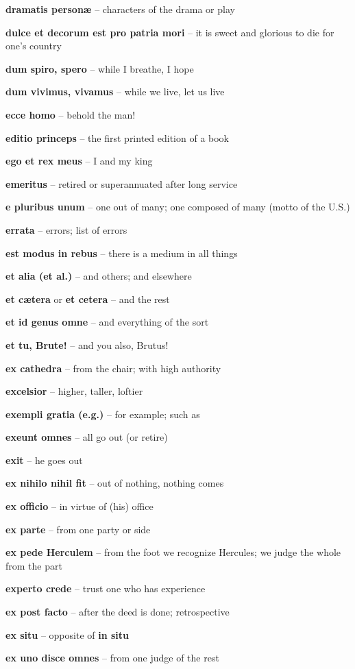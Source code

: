 \documentclass[12pt]{article}
\newcommand{\lat}[1]{\textbf{#1}}
\begin{document}
\lat{dramatis person\ae} -- characters of the drama or play

\lat{dulce et decorum est pro patria mori} -- it is sweet and glorious to die for one's country

\lat{dum spiro, spero} -- while I breathe, I hope

\lat{dum vivimus, vivamus} -- while we live, let us live

\lat{ecce homo} -- behold the man!

\lat{editio princeps} -- the first printed edition of a book

\lat{ego et rex meus} -- I and my king

\lat{emeritus} -- retired or superannuated after long service

\lat{e pluribus unum} -- one out of many; one composed of many (motto of the U.S.)

\lat{errata} -- errors; list of errors

\lat{est modus in rebus} -- there is a medium in all things

\lat{et alia (et al.)} -- and others; and elsewhere

\lat{et c\ae{tera}} or \lat{et cetera} -- and the rest

\lat{et id genus omne} -- and everything of the sort

\lat{et tu, Brute!} -- and you also, Brutus!

\lat{ex cathedra} -- from the chair; with high authority

\lat{excelsior} -- higher, taller, loftier

\lat{exempli gratia (e.g.)} -- for example; such as

\lat{exeunt omnes} -- all go out (or retire)

\lat{exit} -- he goes out

\lat{ex nihilo nihil fit} -- out of nothing, nothing comes

\lat{ex officio} -- in virtue of (his) office

\lat{ex parte} -- from one party or side

\lat{ex pede Herculem} -- from the foot we recognize Hercules; we judge the whole from the part

\lat{experto crede} -- trust one who has experience

\lat{ex post facto} -- after the deed is done; retrospective

\lat{ex situ} -- opposite of \lat{in situ}

\lat{ex uno disce omnes} -- from one judge of the rest
\end{document}
